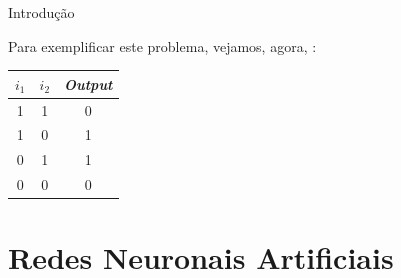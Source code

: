 \begin{frame}{Introdução \cont}
	    
	Para exemplificar este problema, vejamos, agora, :
	    
	\medskip
	
	\begin{minipage}{0.45\linewidth}
		\begin{table}
			\centering
			\begin{tabular}{ccc}
				\toprule
				$i_1$ & $i_2$ & \textit{Output} \\
				\midrule
				1     & 1     & 0               \\
				1     & 0     & 1               \\
				0     & 1     & 1               \\
				0     & 0     & 0               \\
				\bottomrule
			\end{tabular}
		\end{table}
	\end{minipage}
	\begin{minipage}{0.45\linewidth}
		\begin{figure}
			\centering
			\resizebox{!}{0.7\textwidth}{
				
			}
		\end{figure}
	\end{minipage}
    
    \medskip
    
	
\end{frame}

\section{Redes Neuronais Artificiais}

